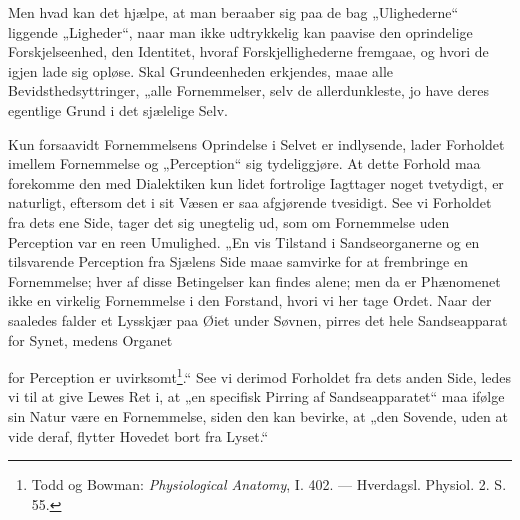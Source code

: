 \documentclass[12pt,a4paper]{book}
\begin{document}
Men hvad kan det hjælpe, at man beraaber sig paa de bag „Ulighederne“
liggende „Ligheder“, naar man ikke udtrykkelig kan paavise den
oprindelige Forskjelseenhed, den Identitet, hvoraf Forskjellighederne
fremgaae, og hvori de igjen lade sig opløse. Skal Grundeenheden
erkjendes, maae alle Bevidsthedsyttringer, „alle Fornemmelser, selv de
allerdunkleste, jo have deres egentlige Grund i det sjælelige Selv.

Kun forsaavidt Fornemmelsens Oprindelse i Selvet er indlysende, lader
Forholdet imellem Fornemmelse og „Perception“ sig tydeliggjøre. At dette
Forhold maa forekomme den med Dialektiken kun lidet fortrolige Iagttager
noget tvetydigt, er naturligt, eftersom det i sit Væsen er saa afgjørende
tvesidigt. See vi Forholdet fra dets ene Side, tager det sig unegtelig
ud, som om Fornemmelse uden Perception var en reen Umulighed. „En vis
Tilstand i Sandseorganerne og en tilsvarende Perception fra Sjælens Side
maae samvirke for at frembringe en Fornemmelse; hver af disse Betingelser
kan findes alene; men da er Phænomenet ikke en virkelig Fornemmelse i den
Forstand, hvori vi her tage Ordet. Naar der saaledes falder et Lysskjær
paa Øiet under Søvnen, pirres det hele Sandseapparat for Synet, medens
Organet

\setcounter{footnote}{0}
for Perception er uvirksomt\footnote{Todd og Bowman: \textit{Physiological
Anatomy}, I. 402. --- Hverdagsl. Physiol. 2. S. 55.}.“ See vi derimod Forholdet
fra dets anden Side, ledes vi til at give Lewes Ret i, at „en specifisk Pirring
af Sandseapparatet“ maa ifølge sin Natur være en Fornemmelse, siden den kan
bevirke, at „den Sovende, uden at vide deraf, flytter Hovedet bort fra Lyset.“
\end{document}
